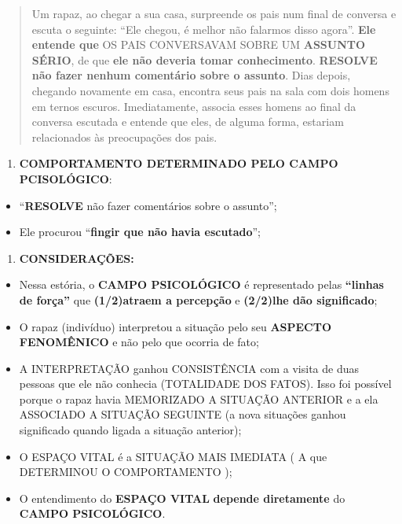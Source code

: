 \documentclass[
]{book}
\providecommand{\tightlist}{%
  \setlength{\itemsep}{0pt}\setlength{\parskip}{0pt}}
\begin{document}
\begin{quote}
Um rapaz, ao chegar a sua casa, surpreende os pais num final de conversa
e escuta o seguinte: ``Ele chegou, é melhor não falarmos disso agora''.
\textbf{Ele entende que} OS PAIS CONVERSAVAM SOBRE UM \textbf{ASSUNTO
SÉRIO}, de que \textbf{ele não deveria tomar conhecimento}.
\textbf{RESOLVE não fazer nenhum comentário sobre o assunto}. Dias
depois, chegando novamente em casa, encontra seus pais na sala com dois
homens em ternos escuros. Imediatamente, associa esses homens ao final
da conversa escutada e entende que eles, de alguma forma, estariam
relacionados às preocupações dos pais.
\end{quote}

\begin{enumerate}
\def\labelenumi{\arabic{enumi}.}
\setcounter{enumi}{1}
\tightlist
\item
  \textbf{COMPORTAMENTO DETERMINADO PELO CAMPO PCISOLÓGICO}:
\end{enumerate}

\begin{itemize}
\tightlist
\item
  ``\textbf{RESOLVE} não fazer comentários sobre o assunto'';
\item
  Ele procurou ``\textbf{fingir que não havia escutado}'';
\end{itemize}

\begin{enumerate}
\def\labelenumi{\arabic{enumi}.}
\setcounter{enumi}{2}
\tightlist
\item
  \textbf{CONSIDERAÇÕES:}
\end{enumerate}

\begin{itemize}
\tightlist
\item
  Nessa estória, o \textbf{CAMPO PSICOLÓGICO} é representado pelas
  \textbf{``linhas de força''} que \textbf{(1/2)atraem a percepção} e
  \textbf{(2/2)lhe dão significado};
\item
  O rapaz (indivíduo) interpretou a situação pelo seu \textbf{ASPECTO
  FENOMÊNICO} e não pelo que ocorria de fato;
\item
  A INTERPRETAÇÃO ganhou CONSISTÊNCIA com a visita de duas pessoas que
  ele não conhecia (TOTALIDADE DOS FATOS). Isso foi possível porque o
  rapaz havia MEMORIZADO A SITUAÇÃO ANTERIOR e a ela ASSOCIADO A
  SITUAÇÃO SEGUINTE (a nova situações ganhou significado quando ligada a
  situação anterior);
\item
  O ESPAÇO VITAL é a SITUAÇÃO MAIS IMEDIATA ( A que DETERMINOU O
  COMPORTAMENTO );
\item
  O entendimento do \textbf{ESPAÇO VITAL} \textbf{depende diretamente}
  do \textbf{CAMPO PSICOLÓGICO}.
\end{itemize}
\end{document}
